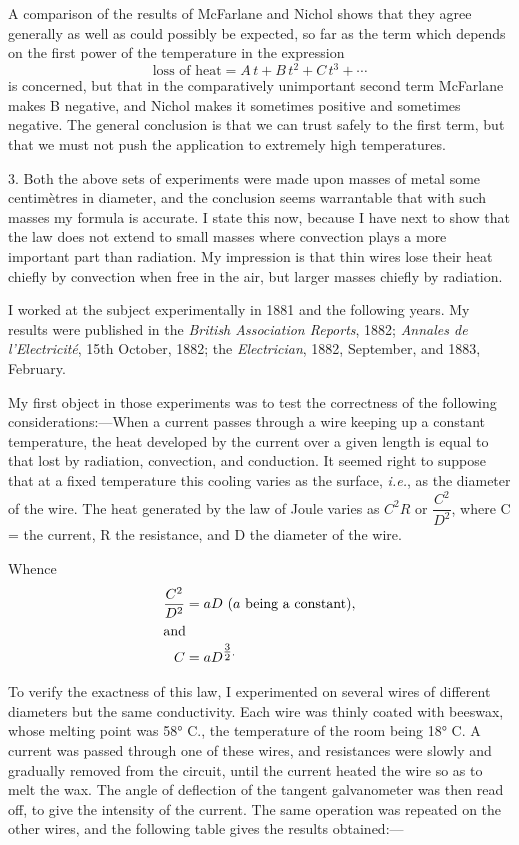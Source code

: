 \documentclass[12pt,oneside]{book}[2021/10/04]
\newcommand{\ie}{\textit{i.e.}}
\begin{document}
A comparison of the results of McFarlane and Nichol shows
that they agree generally as well as could possibly be expected,
so far as the term which depends on the first power of the
temperature in the expression
\[
\text{loss of heat} = A\,t + B\,t^2 + C\,t^3 + \cdots
\]
is concerned, but that in the comparatively unimportant second
term McFarlane makes B negative, and Nichol makes it sometimes
positive and sometimes negative. The general conclusion
is that we can trust safely to the first term, but that we must not
push the application to extremely high temperatures.

3. Both the above sets of experiments were made upon
masses of metal some centimètres in diameter, and the conclusion
seems warrantable that with such masses my formula is accurate.
I state this now, because I have next to show that the law does not
extend to small masses where convection plays a more important
part than radiation. My impression is that thin wires lose their
heat chiefly by convection when free in the air, but larger masses
chiefly by radiation.

I worked at the subject experimentally in 1881 and the
following years. My results were published in the \textit{British
Association Reports}, 1882; \textit{Annales de l'Electricité}, 15th October,
1882; the \textit{Electrician}, 1882, September, and 1883, February.

My first object in those experiments was to test the correctness
of the following considerations:—When a current passes
through a wire keeping up a constant temperature, the heat
developed by the current over a given length is equal to that
lost by radiation, convection, and conduction. It seemed right
to suppose that at a fixed temperature this cooling varies as the
surface, \ie, as the diameter of the wire. The heat generated
by the law of Joule varies as \(C^2 R\) or \(\dfrac{C^2}{D^2}\), where C = the current,
R the resistance, and D the diameter of the wire.

Whence
\begin{align*}
\frac{C^2}{D^2} &= a D~(a\text{ being a constant}),\\
\shortintertext{and}
C &= a D^{\tfrac{3}{2}.}
\end{align*}

To verify the exactness of this law, I experimented on several
wires of different diameters but the same conductivity. Each
wire was thinly coated with beeswax, whose melting point was
58° C., the temperature of the room being 18° C\@. A current
was passed through one of these wires, and resistances were slowly
and gradually removed from the circuit, until the current heated
the wire so as to melt the wax. The angle of deflection of the
tangent galvanometer was then read off, to give the intensity of
the current. The same operation was repeated on the other wires,
and the following table gives the results obtained:—
\end{document}
